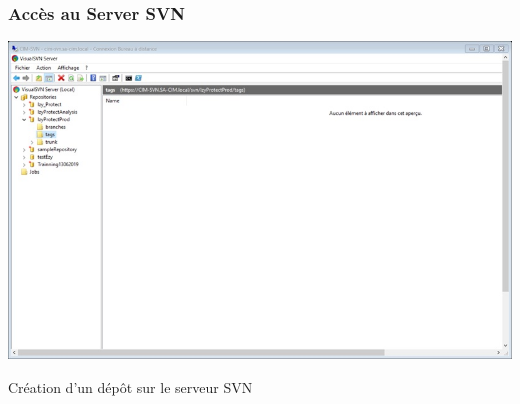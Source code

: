 \documentclass{beamer}
\begin{document}
\begin{frame}
\frametitle{Accès au Server SVN }
\includegraphics[scale=.5]{../images/server4.jpg}
\end{frame}

\begin{frame}
\begin{center}
\huge{Création d'un dépôt sur le serveur SVN}
\end{center}
\end{frame}
\end{document}
